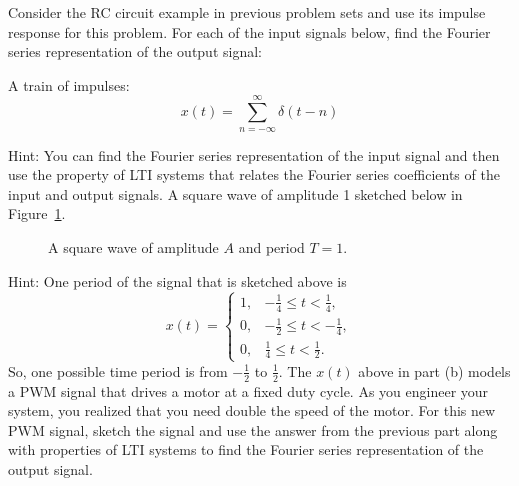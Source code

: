 \documentclass{ee102_pset}
\author{\rule{3cm}{0.4pt}} %
\begin{document}
Consider the RC circuit example in previous problem sets and use its impulse response for this problem. For each of the input signals below, find the Fourier series representation of the output signal:

\problempart[20 points] A train of impulses:
\[
x(t) = \sum_{n=-\infty}^{\infty} \delta(t - n)
\]

Hint: You can find the Fourier series representation of the input signal and then use the property of LTI systems that relates the Fourier series coefficients of the input and output signals.
\problempart[20 points] A square wave of amplitude 1 sketched below in Figure~\ref{fig:square_wave}. 
\begin{figure}[h]
  \centering
\caption{A square wave of amplitude $A$ and period $T=1$.}
\label{fig:square_wave}


\end{figure}

Hint: One period of the signal that is sketched above is \[
x(t) = \begin{cases}
1, & -\tfrac{1}{4} \le t < \tfrac{1}{4},\\
0, & -\tfrac{1}{2} \le t < -\tfrac{1}{4},\\
0, & \tfrac{1}{4} \le t < \tfrac{1}{2}.
\end{cases}
\]
So, one possible time period is from $-\tfrac{1}{2}$ to $\tfrac{1}{2}$.
\problempart[20 points] The $x(t)$ above in part (b) models a PWM signal that drives a motor at a fixed duty cycle. As you engineer your system, you realized that you need double the speed of the motor. For this new PWM signal, sketch the signal and use the answer from the previous part along with properties of LTI systems to find the Fourier series representation of the output signal.
\end{document}
